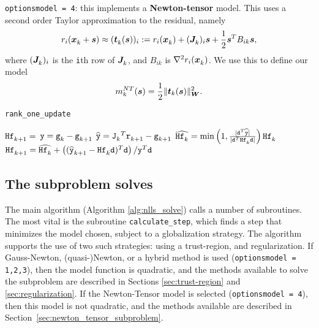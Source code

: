 \begin{description}
\item {\tt options\ct model = 4}: this implements a {\bf Newton-tensor} model.  
This uses a second order Taylor approximation to the residual, namely
\[r_i(\iter{\vx} + \vs) \approx (\iter{\vt}(\vs))_i := r_i(\iter{\vx}) + (\iter{\vJ})_i\vs + \frac{1}{2}\vs^T B_{ik}\vs,\]
where $(\iter{\vJ})_i$ is the {\tt i}th row of $\iter{\vJ}$, and $B_{ik}$ is $\nabla^2 r_i(\iter{\vx})$.  We use this to define our model
\begin{equation}
  \label{eq:newton-tensor-model}
  m_k^{NT}(\vs) = \frac{1}{2}\|\vt_k(\vs)\|_\vW^2.
\end{equation}

\end{description}


\begin{algorithm}
\caption{{\tt rank\_one\_update}}
\label{alg:rank_one_update}
  \begin{algorithmic}
     $\iter[k+1]{\thess} = $ 
    \State $\ty = \iter[k]{\tg} - \iter[k+1]{\tg}$ \State
    $\widehat{\ty} = {\iter[k]{\tJ}}^T \iter[k+1]{\tr} -
    \iter[k+1]{\tg}$ \State $\widehat{\iter[k]{\thess}} = \min\left(
      1, \frac{|\td^T\widehat{\ty}|}{|\td^T\iter[k]{\thess}\td|}\right)
    \iter[k]{\thess}$ \State $\iter[k+1]{\thess} =
    \widehat{\iter[k]{\thess}} + \left(({\iter[k+1]{\widehat{\ty}}} -
      \iter[k]{\thess}\td )^T\td\right)/\ty^T\td$

  \end{algorithmic}
\end{algorithm}


\subsection{The subproblem solves}
\label{sec:subproblem solves}


The main algorithm (Algorithm \ref{alg:nlls_solve}) calls a number of subroutines.  
The most vital is the subroutine {\tt calculate\_step}, which finds a step that 
minimizes the model chosen, subject to a globalization strategy.  The algorithm 
supports the use of two such strategies: using a trust-region, and regularization.
If Gauss-Newton, (quasi-)Newton, or a hybrid method is used 
({\tt options\ct model = 1,2,3}), then the model function is quadratic, and 
the methods available to solve the subproblem are described in 
Sections \ref{sec:trust-region} and \ref{sec:regularization}.  
If the Newton-Tensor model is selected ({\tt options\ct model = 4}), then this 
model is not quadratic, and the methods available are described in Section~\ref{sec:newton_tensor_subproblem}.

